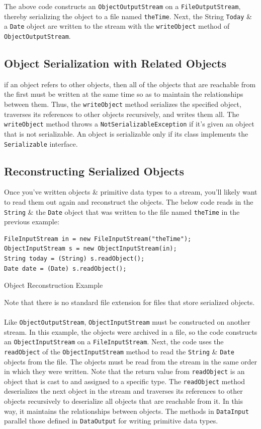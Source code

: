 \documentclass[a4paper,11pt]{article}
\newenvironment{code}{\captionsetup{type=listing}}{}
\begin{document}
The above code constructs an \verb|ObjectOutputStream| on a \verb|FileOutputStream|, thereby serializing the
object to a file named \verb|theTime|.
Next, the String \verb|Today| \& a \verb|Date| object are written to the stream with the \verb|writeObject|
method of \verb|ObjectOutputStream|.

\subsection{Object Serialization with Related Objects}
if an object refers to other objects, then all of the objects that are reachable from the first must be written
at the same time so as to maintain the relationships between them.
Thus, the \verb|writeObject| method serializes the specified object, traverses its references to other objects 
recursively, and writes them all. 
The \verb|writeObject| method throws a \verb|NotSerializableException| if it's given an object that is not 
serializable.
An object is serializable only if its class implements the \verb|Serializable| interface.

\subsection{Reconstructing Serialized Objects}
Once you've written objects \& primitive data types to a stream, you'll likely want to read them out again and 
reconstruct the objects.
The below code reads in the \verb|String| \& the \verb|Date| object that was written to the file named
\verb|theTime| in the previous example:
\begin{code}
\begin{verbatim}
FileInputStream in = new FileInputStream("theTime");
ObjectInputStream s = new ObjectInputStream(in);
String today = (String) s.readObject();
Date date = (Date) s.readObject();
\end{verbatim}
\caption{Object Reconstruction Example}
\end{code}

Note that there is no standard file extension for files that store serialized objects.
\\\\
Like \verb|ObjectOutputStream|, \verb|ObjectInputStream| must be constructed on another stream. 
In this example, the objects were archived in a file, so the code constructs an \verb|ObjectInputStream| on a 
\verb|FileInputStream|.
Next, the code uses the \verb|readObject| of the \verb|ObjectInputStream| method to read the \verb|String| \& 
\verb|Date| objects from the file.
The objects must be read from the stream in the same order in which they were written.
Note that the return value from \verb|readObject| is an object that is cast to and assigned to a specific type.
The \verb|readObject| method deserializes the next object in the stream and traverses its references to other 
objects recursively to deserialize all objects that are reachable from it.
In this way, it maintains the relationships between objects.
The methods in \verb|DataInput| parallel those defined in \verb|DataOutput| for writing primitive data types.
\end{document}
